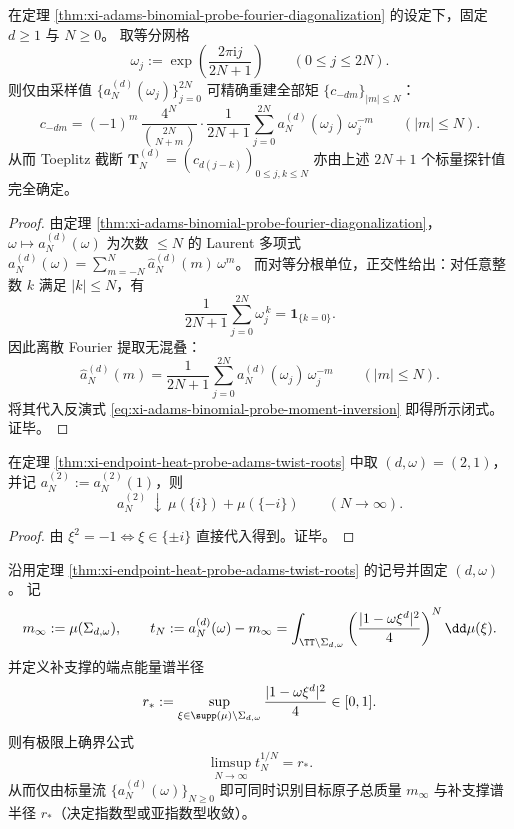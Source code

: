 \begin{proposition}\label{prop:xi-adams-binomial-probe-discrete-inversion-equispaced-grid}
在定理 \ref{thm:xi-adams-binomial-probe-fourier-diagonalization} 的设定下，固定 \(d\ge 1\) 与 \(N\ge 0\)。
取等分网格
\[
\omega_j:=\exp\!\left(\frac{2\pi \mathrm{i}j}{2N+1}\right)\qquad(0\le j\le 2N).
\]
则仅由采样值 \(\{a_N^{(d)}(\omega_j)\}_{j=0}^{2N}\) 可精确重建全部矩 \(\{c_{-dm}\}_{|m|\le N}\)：
\[
\boxed{\;
c_{-dm}
=(-1)^m\,\frac{4^N}{\binom{2N}{N+m}}\cdot
\frac{1}{2N+1}\sum_{j=0}^{2N} a_N^{(d)}(\omega_j)\,\omega_j^{-m}\qquad(|m|\le N).\;}
\]
从而 Toeplitz 截断 \(\mathbf{T}^{(d)}_N=(c_{d(j-k)})_{0\le j,k\le N}\) 亦由上述 \(2N+1\) 个标量探针值完全确定。
\end{proposition}
\begin{proof}
由定理 \ref{thm:xi-adams-binomial-probe-fourier-diagonalization}，\(\omega\mapsto a_N^{(d)}(\omega)\) 为次数 \(\le N\) 的 Laurent 多项式
\(
a_N^{(d)}(\omega)=\sum_{m=-N}^{N}\widehat a_N^{(d)}(m)\,\omega^{m}
\)。
而对等分根单位，正交性给出：对任意整数 \(k\) 满足 \(|k|\le N\)，有
\[
\frac{1}{2N+1}\sum_{j=0}^{2N}\omega_j^{\,k}
=\mathbf 1_{\{k=0\}}.
\]
因此离散 Fourier 提取无混叠：
\[
\widehat a_N^{(d)}(m)
=\frac{1}{2N+1}\sum_{j=0}^{2N} a_N^{(d)}(\omega_j)\,\omega_j^{-m}\qquad(|m|\le N).
\]
将其代入反演式 \eqref{eq:xi-adams-binomial-probe-moment-inversion} 即得所示闭式。证毕。
\end{proof}

\begin{corollary}[半角纤维的可核验质量]\label{cor:xi-endpoint-heat-probe-adams-twist-halfangle}
在定理 \ref{thm:xi-endpoint-heat-probe-adams-twist-roots} 中取 \((d,\omega)=(2,1)\)，并记 \(a_N^{(2)}:=a_N^{(2)}(1)\)，则
\[
a_N^{(2)}\ \downarrow\ \mu(\{i\})+\mu(\{-i\})\qquad(N\to\infty).
\]
\end{corollary}

\begin{proof}
由 \(\xi^2=-1\iff \xi\in\{\pm i\}\) 直接代入得到。证毕。
\end{proof}

\begin{theorem}[由单标量探针序列识别补支撑谱半径]\label{thm:xi-endpoint-heat-probe-cyclotomic-complement-radius}
沿用定理 \ref{thm:xi-endpoint-heat-probe-adams-twist-roots} 的记号并固定 \((d,\omega)\)。
记
\[
m_\infty:=\mu(\Sigma_{d,\omega}),
\qquad
t_N:=a_N^{(d)}(\omega)-m_\infty
=\int_{\TT\setminus\Sigma_{d,\omega}}\left(\frac{|1-\omega\xi^{d}|^2}{4}\right)^{N}\dd\mu(\xi).
\]
并定义补支撑的端点能量谱半径
\[
r_\ast:=\sup_{\xi\in\supp(\mu)\setminus\Sigma_{d,\omega}}\frac{|1-\omega\xi^{d}|^2}{4}\in[0,1].
\]
则有极限上确界公式
\[
\boxed{\;\limsup_{N\to\infty} t_N^{1/N}=r_\ast.\;}
\]
从而仅由标量流 \(\{a_N^{(d)}(\omega)\}_{N\ge 0}\) 即可同时识别目标原子总质量 \(m_\infty\) 与补支撑谱半径 \(r_\ast\)（决定指数型或亚指数型收敛）。
\end{theorem}

